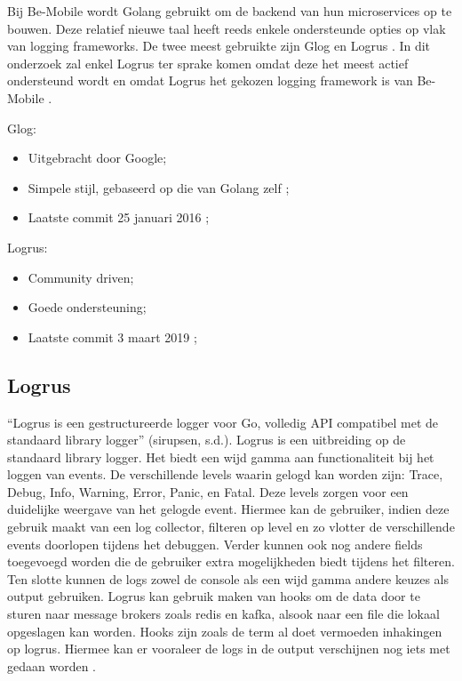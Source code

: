 Bij Be-Mobile wordt Golang gebruikt om de backend van hun microservices op te bouwen. Deze relatief nieuwe taal heeft reeds enkele ondersteunde opties op vlak van logging frameworks. De twee meest gebruikte zijn Glog en Logrus \autocite{Dietrich2018}. In dit onderzoek zal enkel Logrus ter sprake komen omdat deze het meest actief ondersteund wordt en omdat Logrus het gekozen logging framework is van Be-Mobile \autocite{jens2019}.

Glog:
\begin{itemize}
    \item Uitgebracht door Google;
    \item Simpele stijl, gebaseerd op die van Golang zelf \autocite{Dietrich2018};
    \item Laatste commit 25 januari 2016 \autocite{Glog2013};
\end{itemize}

Logrus:
\begin{itemize}
    \item Community driven;
    \item Goede ondersteuning;
    \item Laatste commit 3 maart 2019 \autocite{sirupsen2014};
\end{itemize}

\subsection{Logrus}
“Logrus is een gestructureerde logger voor Go, volledig API compatibel met de standaard library logger” (sirupsen, s.d.). Logrus is een uitbreiding op de standaard library logger. Het biedt een wijd gamma aan functionaliteit bij het loggen van events. De verschillende levels waarin gelogd kan worden zijn: Trace, Debug, Info, Warning, Error, Panic, en Fatal. Deze levels zorgen voor een duidelijke weergave van het gelogde event. Hiermee kan de gebruiker, indien deze gebruik maakt van een log collector, filteren op level en zo vlotter de verschillende events doorlopen tijdens het debuggen. Verder kunnen ook nog andere fields toegevoegd worden die de gebruiker extra mogelijkheden biedt tijdens het filteren. Ten slotte kunnen de logs zowel de console als een wijd gamma andere keuzes als output gebruiken. Logrus kan gebruik maken van hooks om de data door te sturen naar message brokers zoals redis en kafka, alsook naar een file die lokaal opgeslagen kan worden. Hooks zijn zoals de term al doet vermoeden inhakingen op logrus. Hiermee kan er vooraleer de logs in de output verschijnen nog iets met gedaan worden \autocite{sirupsen2014}.

